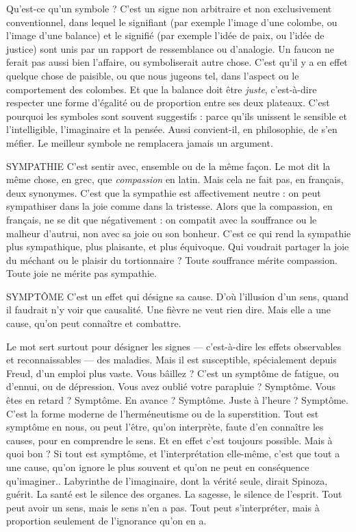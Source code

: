 Qu'est-ce qu’un symbole ? C’est un signe non arbitraire et non exclusivement
conventionnel, dans lequel le signifiant (par exemple l’image d’une
colombe, ou l’image d’une balance) et le signifié (par exemple l’idée de paix, ou
l’idée de justice) sont unis par un rapport de ressemblance ou d’analogie. Un
faucon ne ferait pas aussi bien l'affaire, ou symboliserait autre chose. C’est qu'il
y a en effet quelque chose de paisible, ou que nous jugeons tel, dans l'aspect ou
le comportement des colombes. Et que la balance doit être {\it juste}, c’est-à-dire
respecter une forme d’égalité ou de proportion entre ses deux plateaux. C'est
pourquoi les symboles sont souvent suggestifs : parce qu’ils unissent le sensible
et l’intelligible, l'imaginaire et la pensée. Aussi convient-il, en philosophie, de
s’en méfier. Le meilleur symbole ne remplacera jamais un argument.

SYMPATHIE C’est sentir avec, ensemble ou de la même façon. Le mot dit
la même chose, en grec, que {\it compassion} en latin. Mais cela ne
fait pas, en français, deux synonymes. C’est que la sympathie est affectivement
neutre : on peut sympathiser dans la joie comme dans la tristesse. Alors que la
compassion, en français, ne se dit que négativement : on compatit avec la souffrance
ou le malheur d’autrui, non avec sa joie ou son bonheur. C’est ce qui
rend la sympathie plus sympathique, plus plaisante, et plus équivoque. Qui
voudrait partager la joie du méchant ou le plaisir du tortionnaire ? Toute souffrance
mérite compassion. Toute joie ne mérite pas sympathie.

SYMPTÔME C’est un effet qui désigne sa cause. D’où l'illusion d’un sens,
quand il faudrait n’y voir que causalité. Une fièvre ne veut rien
dire. Mais elle a une cause, qu’on peut connaître et combattre.

Le mot sert surtout pour désigner les signes — c’est-à-dire les effets observables
et reconnaissables — des maladies. Mais il est susceptible, spécialement
depuis Freud, d’un emploi plus vaste. Vous bâillez ? C’est un symptôme de
fatigue, ou d’ennui, ou de dépression. Vous avez oublié votre parapluie ?
Symptôme. Vous êtes en retard ? Symptôme. En avance ? Symptôme. Juste à
l'heure ? Symptôme. C’est la forme moderne de l’herméneutisme ou de la
superstition. Tout est symptôme en nous, ou peut l'être, qu’on interprète, faute
d'en connaître les causes, pour en comprendre le sens. Et en effet c’est toujours
possible. Mais à quoi bon ? Si tout est symptôme, et l'interprétation elle-même,
c'est que tout a une cause, qu’on ignore le plus souvent et qu’on ne peut en
conséquence qu'imaginer.. Labyrinthe de l'imaginaire, dont la vérité seule,
dirait Spinoza, guérit. La santé est le silence des organes. La sagesse, le silence
de l'esprit. Tout peut avoir un sens, mais le sens n’en a pas. Tout peut s’interpréter,
mais à proportion seulement de l’ignorance qu’on en a.

